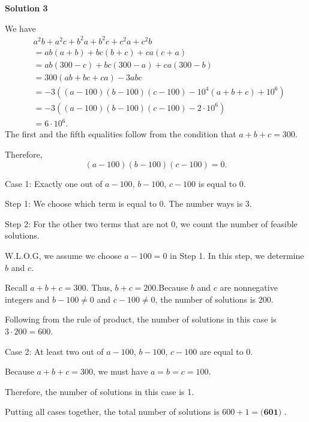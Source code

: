 \begin{enumerate}
\textbf{Solution 3}

We have\begin{align*}& a^2 b + a^2 c + b^2 a + b^2 c + c^2 a + c^2 b \\& = ab \left( a + b \right) + bc \left( b + c \right) + ca \left( c + a \right) \\& = ab \left( 300 - c \right) + bc \left( 300 - a \right) + ca \left( 300 - b \right) \\& = 300 \left( ab + bc + ca \right) - 3 abc \\& = -3 \left(\left( a - 100 \right) \left( b - 100 \right) \left( c - 100 \right)- 10^4 \left( a + b + c \right) + 10^6\right) \\& = -3 \left(\left( a - 100 \right) \left( b - 100 \right) \left( c - 100 \right)- 2 \cdot  10^6\right) \\& = 6 \cdot 10^6 .\end{align*}
The first and the fifth equalities follow from the condition that $a+b+c = 300$.

 Therefore,
 \[\left( a - 100 \right) \left( b - 100 \right) \left( c - 100 \right) = 0 .\]

 Case 1: Exactly one out of $a - 100$, $b - 100$, $c - 100$ is equal to 0.

 Step 1: We choose which term is equal to 0. The number ways is 3.

 Step 2: For the other two terms that are not 0, we count the number of feasible solutions.

 W.L.O.G, we assume we choose $a - 100 = 0$ in Step 1. In this step, we determine $b$ and $c$.

 Recall $a + b + c = 300$. Thus, $b + c = 200$.Because $b$ and $c$ are nonnegative integers and $b - 100 \neq 0$ and $c - 100 \neq 0$, the number of solutions is 200.

 Following from the rule of product, the number of solutions in this case is $3 \cdot 200 = 600$.

 Case 2: At least two out of $a - 100$, $b - 100$, $c - 100$ are equal to 0.

 Because $a + b + c = 300$, we must have $a = b = c = 100$.

 Therefore, the number of solutions in this case is 1.

 Putting all cases together, the total number of solutions is $600 + 1 = \boxed{\textbf{(601) }}$.

 


 




\end{enumerate}
